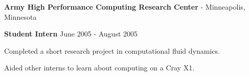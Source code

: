 {\textbf{Army High Performance Computing Research Center} - Minneapolis, Minnesota
\begin{outerlist}
\item[] \textbf{Student Intern} \hfill June 2005 - August 2005
\begin{innerlist}
 \item Completed a short research project in computational fluid dynamics. 
 \item Aided other interns to learn about computing on a Cray X1. 
\end{innerlist}
\end{outerlist}
}

\newcommand{\myretailjobs}
{
\hrefgreen{http://www.bookstore.mtu.edu/michtech2}{\textbf{University Images}} - Houghton, Michigan
\begin{outerlist}
\item[] \textbf{Sales Clerk} \hfill  November 2002 - January 2003
 \begin{innerlist}
  \item Operated a cash register, assisted with inventory, and closed the store.
 \end{innerlist}
\end{outerlist}
}

\newcommand{\mypublications}{\begin{bibsection} \end{bibsection} }

\newcommand{\mypresentations}
{
\begin{outerlist}
\item[] \textit{The FFTW and NVIDIA CUDA CUFFT Libraries}
\begin{innerlist}
\item[] Lecture in CS5331: Parallel Algorithms, Michigan Technological University (2009)
\end{innerlist}
\item[] \textit{Effect of Fractal Dimension in a Nanoparticle Growth Simulation}
\begin{innerlist}
\item[] Final Presentation, Summer Institute 2005, AHPCRC (2005)
\end{innerlist}
\end{outerlist}
}

